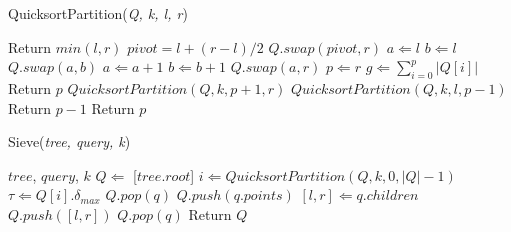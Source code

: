 \begin{algorithm} %
    \caption{QuicksortPartition(\emph{Q, k, l, r})} %
    \label{alg:quicksort-partition} %
    \begin{algorithmic}[5] %
            \STATE Return $min(l, r)$
        \ELSE 
            \STATE $pivot = l + (r - l) / 2$
            \STATE $Q.swap(pivot, r)$
            \STATE $a \Leftarrow l$
            \STATE $b \Leftarrow l$
                    \STATE $Q.swap(a, b)$
                    \STATE $a \Leftarrow a + 1$
                \ENDIF
                \STATE $b \Leftarrow b + 1$
            \ENDWHILE
            \STATE $Q.swap(a, r)$
            \STATE $p \Leftarrow r$
            \STATE $g \Leftarrow \sum_{i=0}^{p} |Q[i]|$
                \STATE Return $p$
                \STATE $QuicksortPartition(Q, k, p + 1, r)$
            \ELSE 
                    \STATE $QuicksortPartition(Q, k, l, p - 1)$
                    \STATE Return $p - 1$
                \ELSE
                    \STATE Return $p$
                \ENDIF
            \ENDIF
        \ENDIF
    \end{algorithmic}
    \end{algorithm}

\begin{algorithm} %
    \caption{Sieve(\emph{tree, query, k})} %
    \label{alg:sieve} %
    \begin{algorithmic}[6] %
        \REQUIRE $tree$, $query$, $k$
        \STATE $Q \Leftarrow$ [$tree.root$]
            \STATE $i \Leftarrow QuicksortPartition(Q, k, 0, |Q| - 1)$
            \STATE $\tau \Leftarrow Q[i].\delta_{max}$
                    \STATE $Q.pop(q)$
                \ENDIF
            \ENDFOR
                    \STATE $Q.push(q.points)$
                \ELSE
                    \STATE $[l, r] \Leftarrow q.children$
                    \STATE $Q.push([l, r])$   
                \ENDIF
                \STATE $Q.pop(q)$
            \ENDFOR 
        \ENDWHILE
        \STATE Return $Q$
    \end{algorithmic}
    \end{algorithm}


